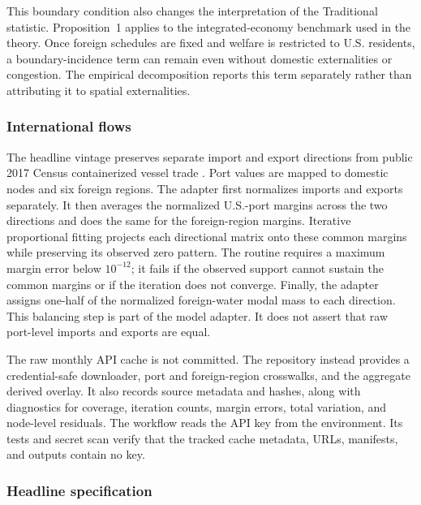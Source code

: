 This boundary condition also changes the interpretation of the Traditional
statistic. Proposition~1 applies to the integrated-economy benchmark used in
the theory. Once foreign schedules are fixed and welfare is restricted to U.S.
residents, a boundary-incidence term can remain even without domestic
externalities or congestion. The empirical decomposition reports this term
separately rather than attributing it to spatial externalities.

\subsubsection{International flows}

The headline vintage preserves separate import and export directions from
public 2017 Census containerized vessel trade
\citep{CensusInternationalTradePort}. Port values are mapped to domestic nodes
and six foreign regions. The adapter first normalizes imports and exports
separately. It then averages the normalized U.S.-port margins across the two
directions and does the same for the foreign-region margins. Iterative
proportional fitting projects each directional matrix onto these common
margins while preserving its observed zero pattern. The routine requires a
maximum margin error below \(10^{-12}\); it fails if the observed support
cannot sustain the common margins or if the iteration does not converge.
Finally, the adapter assigns one-half of the normalized foreign-water modal
mass to each direction. This balancing step is part of the model adapter. It
does not assert that raw port-level imports and exports are equal.

The raw monthly API cache is not committed. The repository instead provides a
credential-safe downloader, port and foreign-region crosswalks, and the
aggregate derived overlay. It also records source metadata and hashes, along
with diagnostics for coverage, iteration counts, margin errors, total
variation, and node-level residuals.
The workflow reads the API key from the environment. Its tests and secret scan
verify that the tracked cache metadata, URLs, manifests, and outputs contain no
key.

\subsubsection{Headline specification}

